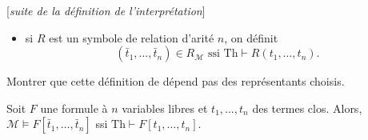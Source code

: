 \documentclass[./main]{subfiles}
\begin{document}
  [\textit{suite de la définition de l'interprétation}]

  \begin{itemize}
    \item si $R$ est un symbole de relation d'arité $n$, on définit 
      \[
        (\bar{t}_1, \ldots, \bar{t}_n) \in R_{\mathcal{M}} \text{ ssi }
        \mathrm{Th} \vdash  R(t_1, \ldots, t_n)
      .\] 
  \end{itemize}

  \begin{exo}
    Montrer que cette définition de dépend pas des représentants choisis.
  \end{exo}

  \begin{lem}
    Soit $F$ une formule à $n$ variables libres et $t_1 ,\ldots, t_n$ des termes clos.
    Alors, $\mathcal{M} \models F[\bar{t}_1, \ldots, \bar{t}_n]$ ssi $\mathrm{Th} \vdash F[t_1, \ldots, t_n]$.
  \end{lem}
\end{document}
